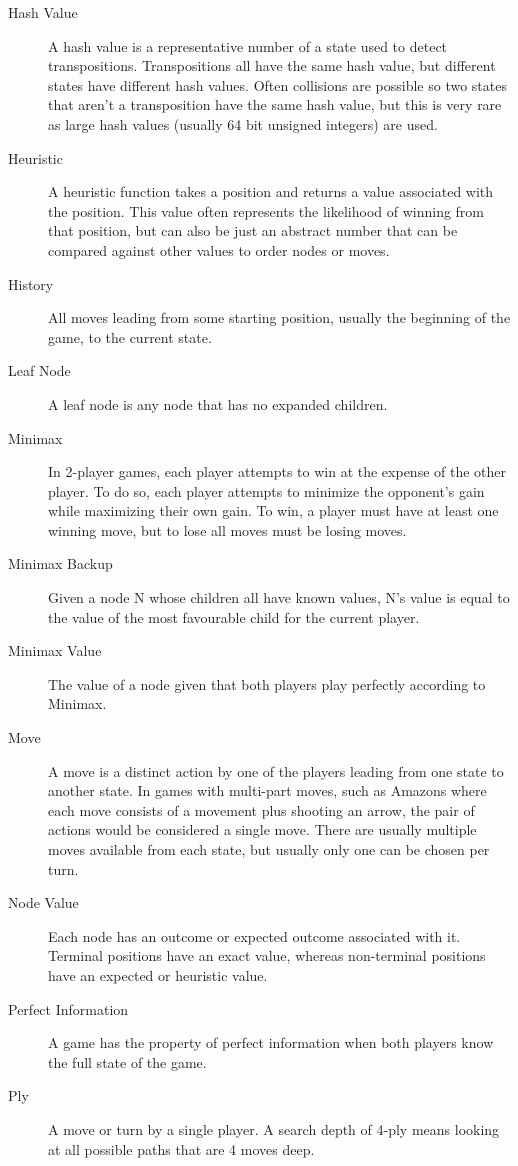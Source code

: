 \begin{description}
\item[Hash Value] A hash value is a representative number of a state used to detect transpositions. Transpositions all have the same hash value, but different states have different hash values. Often collisions are possible so two states that aren't a transposition have the same hash value, but this is very rare as large hash values (usually 64 bit unsigned integers) are used.
\item[Heuristic] A heuristic function takes a position and returns a value associated with the position. This value often represents the likelihood of winning from that position, but can also be just an abstract number that can be compared against other values to order nodes or moves.
\item[History] All moves leading from some starting position, usually the beginning of the game, to the current state.
\item[Leaf Node] A leaf node is any node that has no expanded children.
\item[Minimax] In 2-player games, each player attempts to win at the expense of the other player. To do so, each player attempts to minimize the opponent's gain while maximizing their own gain. To win, a player must have at least one winning move, but to lose all moves must be losing moves.
\item[Minimax Backup] Given a node N whose children all have known values, N's value is equal to the value of the most favourable child for the current player.
\item[Minimax Value] The value of a node given that both players play perfectly according to Minimax.
\item[Move] A move is a distinct action by one of the players leading from one state to another state. In games with multi-part moves, such as Amazons where each move consists of a movement plus shooting an arrow, the pair of actions would be considered a single move. There are usually multiple moves available from each state, but usually only one can be chosen per turn.
\item[Node Value] Each node has an outcome or expected outcome associated with it. Terminal positions have an exact value, whereas non-terminal positions have an expected or heuristic value.
\item[Perfect Information] A game has the property of perfect information when both players know the full state of the game.
\item[Ply] A move or turn by a single player. A search depth of 4-ply means looking at all possible paths that are 4 moves deep.

\end{description}
